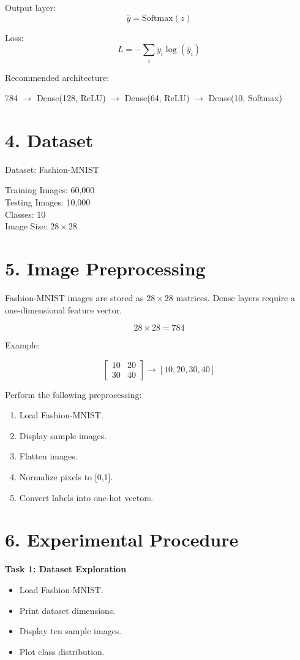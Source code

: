 \documentclass[11pt]{article}
\begin{document}
Output layer:
\[
\hat y=\mathrm{Softmax}(z)
\]

Loss:
\[
L=-\sum_i y_i\log(\hat y_i)
\]

Recommended architecture:

\begin{center}
784 $\rightarrow$ Dense(128, ReLU) $\rightarrow$ Dense(64, ReLU) $\rightarrow$ Dense(10, Softmax)
\end{center}

\section*{4. Dataset}
Dataset: Fashion-MNIST

Training Images: 60,000 \\
Testing Images: 10,000 \\
Classes: 10 \\
Image Size: $28\times28$

\section*{5. Image Preprocessing}

Fashion-MNIST images are stored as $28\times28$ matrices. Dense layers require a one-dimensional feature vector.

\[
28\times28=784
\]

Example:

\[
\begin{bmatrix}
10&20\\30&40
\end{bmatrix}
\rightarrow
[10,20,30,40]
\]

Perform the following preprocessing:

\begin{enumerate}
\item Load Fashion-MNIST.
\item Display sample images.
\item Flatten images.
\item Normalize pixels to [0,1].
\item Convert labels into one-hot vectors.
\end{enumerate}

\section*{6. Experimental Procedure}

\textbf{Task 1: Dataset Exploration}
\begin{itemize}
\item Load Fashion-MNIST.
\item Print dataset dimensions.
\item Display ten sample images.
\item Plot class distribution.
\end{itemize}
\end{document}
